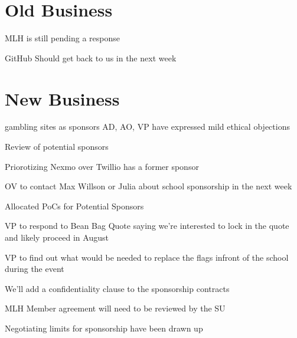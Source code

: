 \documentclass[11pt]{meetingmins}
\begin{document}
\maketitle

\section{Old Business}
\begin{items}
  \item MLH is still pending a response
  \item GitHub Should get back to us in the next week
\end{items}

\section{New Business}
\begin{items}
  \item gambling sites as sponsors
    \subitem AD, AO, VP have expressed mild ethical objections
  \item Review of potential sponsors
    \item Priorotizing Nexmo over Twillio has a former sponsor
  \item OV to contact Max Willson or Julia about school sponsorship in the next week
  \item Allocated PoCs for Potential Sponsors
  \item VP to respond to Bean Bag Quote saying we're interested to lock in the quote and likely proceed in August
  \item VP to find out what would be needed to replace the flags infront of the school during the event
  \item We'll add a confidentiality clause to the sponsorship contracts
  \item MLH Member agreement will need to be reviewed by the SU
  \item Negotiating limits for sponsorship have been drawn up
\end{items}

\vspace{1em}
\end{document}
